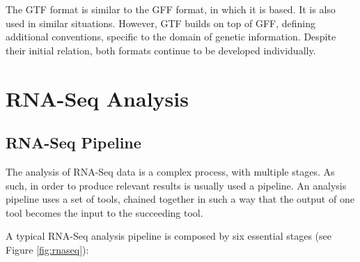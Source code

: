 The GTF format is similar to the GFF format, in which it is based. It is also
used in similar situations. However, GTF builds on top of GFF, defining
additional conventions, specific to the domain of genetic information. Despite
their initial relation, both formats continue to be developed individually.



\section{RNA-Seq Analysis}


\subsection{RNA-Seq Pipeline}

The analysis of RNA-Seq data is a complex process, with multiple stages. As
such, in order to produce relevant results is usually used a pipeline. An
analysis pipeline uses a set of tools, chained together in such a way that the
output of one tool becomes the input to the succeeding tool.

A typical RNA-Seq analysis pipeline is composed by six essential stages
\cite{rnaseqpipeline} (see Figure \ref{fig:rnaseq}):

